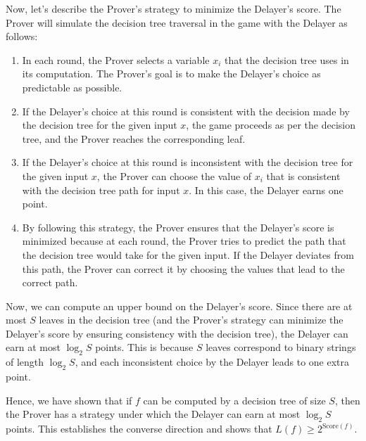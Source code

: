 \documentclass{article}
\begin{document}
Now, let's describe the Prover's strategy to minimize the Delayer's score. The Prover will simulate the decision tree traversal in the game with the Delayer as follows:
\begin{enumerate}
	\item In each round, the Prover selects a variable $x_i$ that the decision tree uses in its computation. The Prover's goal is to make the Delayer's choice as predictable as possible.
	\item If the Delayer's choice at this round is consistent with the decision made by the decision tree for the given input $x$, the game proceeds as per the decision tree, and the Prover reaches the corresponding leaf.
	\item If the Delayer's choice at this round is inconsistent with the decision tree for the given input $x$, the Prover can choose the value of $x_i$ that is consistent with the decision tree path for input $x$. In this case, the Delayer earns one point.
	\item By following this strategy, the Prover ensures that the Delayer's score is minimized because at each round, the Prover tries to predict the path that the decision tree would take for the given input. If the Delayer deviates from this path, the Prover can correct it by choosing the values that lead to the correct path.
\end{enumerate}


Now, we can compute an upper bound on the Delayer's score. Since there are at most $S$ leaves in the decision tree (and the Prover's strategy can minimize the Delayer's score by ensuring consistency with the decision tree), the Delayer can earn at most $\log_2 S$ points. This is because $S$ leaves correspond to binary strings of length $\log_2 S$, and each inconsistent choice by the Delayer leads to one extra point.



Hence, we have shown that if $f$ can be computed by a decision tree of size $S$, then the Prover has a strategy under which the Delayer can earn at most $\log_2 S$ points. This establishes the converse direction and shows that $L(f) \geq 2^{\text{Score}(f)}$.
\end{document}
